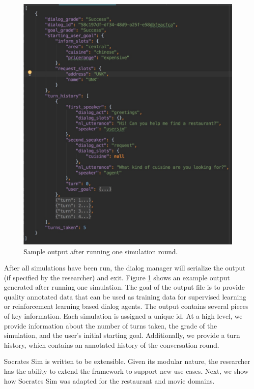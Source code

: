 \begin{figure}[h!]
	\centering
	\includegraphics[scale=.17]{diagrams/sample_save_output.jpeg}
	\caption{ Sample output after running one simulation round. }
	\label{fig:sample_output}
\end{figure}

After all simulations have been run, the dialog manager will serialize the output (if specified by the researcher) and exit. Figure \ref{fig:sample_output} shows an example output generated after running one simulation. The goal of the output file is to provide quality annotated data that can be used as training data for supervised learning or reinforcement learning based dialog agents. The output contains several pieces of key information. Each simulation is assigned a unique id. At a high level, we provide information about the number of turns taken, the grade of the simulation, and the user's initial starting goal. Additionally, we provide a turn history, which contains an annotated history of the conversation round. 

Socrates Sim is written to be extensible. Given its modular nature, the researcher has the ability to extend the framework to support new use cases. Next, we show how Socrates Sim was adapted for the restaurant and movie domains. 


